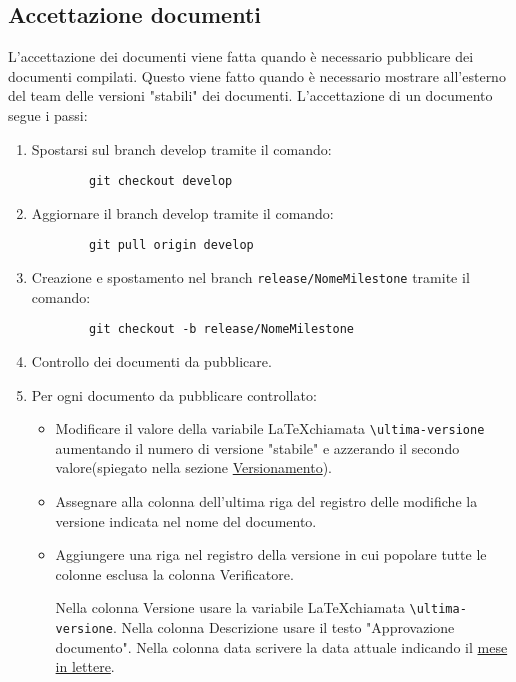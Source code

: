 \documentclass[a4paper, 12pt]{article}
\def\ultima-versione{v0.1}
\begin{document}
\subsection{Accettazione documenti}
\label{subsec:acc}
L'accettazione dei documenti viene fatta quando è necessario pubblicare dei documenti compilati.
Questo viene fatto quando è necessario mostrare all'esterno del team delle versioni "stabili" dei documenti.
L'accettazione di un documento segue i passi:
\begin{enumerate}
    \item Spostarsi sul branch develop tramite il comando:
    \begin{lstlisting}
        git checkout develop
    \end{lstlisting}
     
    \item Aggiornare il branch develop tramite il comando: 
    \begin{lstlisting}
        git pull origin develop
    \end{lstlisting}
    
    \item Creazione e spostamento nel branch \lstinline|release/NomeMilestone| tramite il comando:
    \begin{lstlisting}
        git checkout -b release/NomeMilestone
    \end{lstlisting}

    \item Controllo dei documenti da pubblicare.
    
    \item Per ogni documento da pubblicare controllato:
    \begin{itemize}
        \item Modificare il valore della variabile \LaTeX \space chiamata \lstinline|\ultima-versione| aumentando il numero di versione "stabile" e azzerando il secondo valore(spiegato nella sezione \hyperref[subsec:vers]{Versionamento}).

        \item Assegnare alla colonna dell'ultima riga del registro delle modifiche la versione indicata nel nome del documento.
        
        \item Aggiungere una riga nel registro della versione in cui popolare tutte le colonne esclusa la colonna Verificatore.  
        
        Nella colonna Versione usare la variabile \LaTeX \space chiamata \lstinline|\ultima-versione|.
        Nella colonna Descrizione usare il testo "Approvazione documento".
        Nella colonna data scrivere la data attuale indicando il \underline{mese in lettere}.
    \end{itemize}
   

\end{enumerate}
\end{document}
